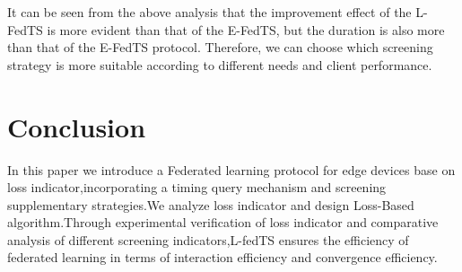 \documentclass{article}
\begin{document}
It can be seen from the above analysis that the improvement effect of the L-FedTS is more evident than that of the E-FedTS, but the duration is also more than that of the E-FedTS protocol. Therefore, we can choose which screening strategy is more suitable according to different needs and client performance.

\section{Conclusion}
In this paper we introduce a Federated learning protocol for edge devices base on loss indicator,incorporating a timing query mechanism and screening supplementary strategies.We analyze loss indicator and design Loss-Based algorithm.Through experimental verification of loss indicator and comparative analysis of different screening indicators,L-fedTS ensures the efficiency of federated learning in terms of interaction efficiency and convergence efficiency. 























\end{document}
